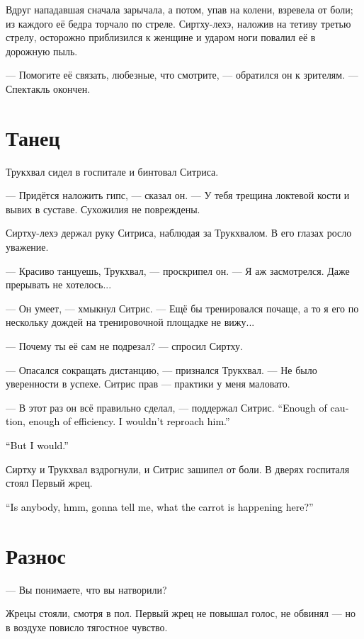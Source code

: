 \documentclass[a4paper,10pt,fleqn]{book}\usepackage{cooltooltips}\usepackage{polyglossia}\setdefaultlanguage{english}\setotherlanguage{russian}\defaultfontfeatures{Ligatures=TeX,Mapping=tex-text} \usepackage{xcolor}\definecolor{lightgray}{HTML}{bbbbbb}\color{lightgray}\newcommand{\ml}[3]{\textcolor{black}{#3}}
\begin{document}
Вдруг нападавшая сначала зарычала, а потом, упав на колени, взревела от боли;
из каждого её бедра торчало по стреле.
Сиртху-лехэ, наложив на тетиву третью стрелу, осторожно приблизился к женщине и ударом ноги повалил её в дорожную пыль.

--- Помогите её связать, любезные, что смотрите, --- обратился он к зрителям.
--- Спектакль окончен.

\section{Танец}

Трукхвал сидел в госпитале и бинтовал Ситриса.

--- Придётся наложить гипс, --- сказал он.
--- У тебя трещина локтевой кости и вывих в суставе.
Сухожилия не повреждены.

Сиртху-лехэ держал руку Ситриса, наблюдая за Трукхвалом.
В его глазах росло уважение.

--- Красиво танцуешь, Трукхвал, --- проскрипел он.
--- Я аж засмотрелся.
Даже прерывать не хотелось...

--- Он умеет, --- хмыкнул Ситрис.
--- Ещё бы тренировался почаще, а то я его по нескольку дождей на тренировочной площадке не вижу...

--- Почему ты её сам не подрезал? --- спросил Сиртху.

--- Опасался сокращать дистанцию, --- признался Трукхвал.
--- Не было уверенности в успехе.
Ситрис прав --- практики у меня маловато.

--- В этот раз он всё правильно сделал, --- поддержал Ситрис.
\ml{$0$}
{--- В меру осторожно, в меру эффективно.}
{``Enough of caution, enough of efficiency.}
\ml{$0$}
{Претензий нет.}
{I wouldn't reproach him.''}

\ml{$0$}
{--- А у меня есть.}
{``But I would.''}

Сиртху и Трукхвал вздрогнули, и Ситрис зашипел от боли.
В дверях госпиталя стоял Первый жрец.

\ml{$0$}
{--- Кто-нибудь, ммм, собирается объяснить мне, что за морковка тут происходит?}
{``Is anybody, hmm, gonna tell me, what the carrot is happening here?''}

\section{Разнос}

--- Вы понимаете, что вы натворили?

Жрецы стояли, смотря в пол.
Первый жрец не повышал голос, не обвинял --- но в воздухе повисло тягостное чувство.
\end{document}
